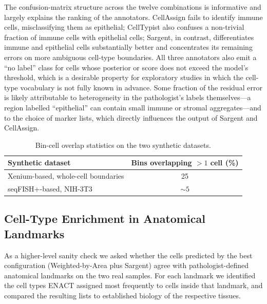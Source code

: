\documentclass[11pt]{article}
\begin{document}
The confusion-matrix structure across the twelve combinations is informative and largely explains the ranking of the annotators. CellAssign fails to identify immune cells, misclassifying them as epithelial; CellTypist also confuses a non-trivial fraction of immune cells with epithelial cells; Sargent, in contrast, differentiates immune and epithelial cells substantially better and concentrates its remaining errors on more ambiguous cell-type boundaries. All three annotators also emit a ``no label'' class for cells whose posterior or score does not exceed the model's threshold, which is a desirable property for exploratory studies in which the cell-type vocabulary is not fully known in advance. Some fraction of the residual error is likely attributable to heterogeneity in the pathologist's labels themselves---a region labelled ``epithelial'' can contain small immune or stromal aggregates---and to the choice of marker lists, which directly influences the output of Sargent and CellAssign.

\begin{table}[htbp]
\centering
\caption{Bin-cell overlap statistics on the two synthetic datasets.}
\label{tab:overlap}
\begin{tabular}{lc}
\toprule
Synthetic dataset & Bins overlapping $>1$ cell (\%) \\
\midrule
Xenium-based, whole-cell boundaries & 25 \\
seqFISH+-based, NIH-3T3 & $\sim 5$ \\
\bottomrule
\end{tabular}
\end{table}

\subsection{Cell-Type Enrichment in Anatomical Landmarks}

As a higher-level sanity check we asked whether the cells predicted by the best configuration (Weighted-by-Area plus Sargent) agree with pathologist-defined anatomical landmarks on the two real samples. For each landmark we identified the cell types ENACT assigned most frequently to cells inside that landmark, and compared the resulting lists to established biology of the respective tissues.
\end{document}
